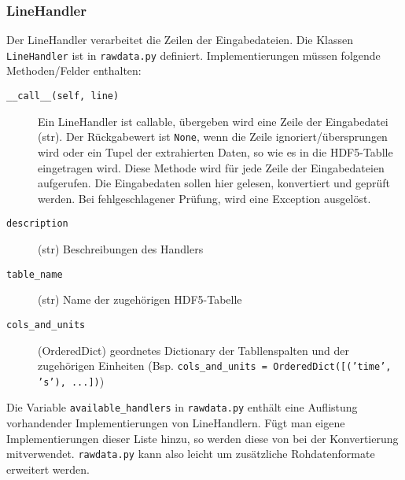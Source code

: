 \documentclass[version=last,
	a4paper,			%
	pagesize, 			%
	11pt,				%
	BCOR1cm,			%
	DIV12,	 			%
	pointlessnumbers,   %
	halfparskip,		%
]{scrreprt}
\begin{document}
\subsubsection{LineHandler}
Der LineHandler verarbeitet die Zeilen der Eingabedateien. Die Klassen \texttt{LineHandler} ist in \texttt{rawdata.py} definiert. Implementierungen müssen folgende Methoden/Felder enthalten:
\begin{description}
  \item[\texttt{\_\_call\_\_(self, line)}] Ein LineHandler ist callable, übergeben wird eine Zeile der Eingabedatei (str). Der Rückgabewert ist \texttt{None}, wenn die Zeile ignoriert/übersprungen wird oder ein Tupel der extrahierten Daten, so wie es in die HDF5-Tablle eingetragen wird. Diese Methode wird für jede Zeile der Eingabedateien aufgerufen. Die Eingabedaten sollen hier gelesen, konvertiert und geprüft werden. Bei fehlgeschlagener Prüfung, wird eine Exception ausgelöst.
  \item[\texttt{description}] (str) Beschreibungen des Handlers
  \item[\texttt{table\_name}] (str) Name der zugehörigen HDF5-Tabelle
  \item[\texttt{cols\_and\_units}] (OrderedDict) geordnetes Dictionary der Tabllenspalten und der zugehörigen Einheiten (Bsp. \texttt{cols\_and\_units = OrderedDict([('time', 's'), ...])})
\end{description}

Die Variable \texttt{available\_handlers} in \texttt{rawdata.py} enthält eine Auflistung vorhandender Implementierungen von LineHandlern. Fügt man eigene Implementierungen dieser Liste hinzu, so werden diese von bei der Konvertierung mitverwendet. \texttt{rawdata.py} kann also leicht um zusätzliche Rohdatenformate erweitert werden.
\end{document}
